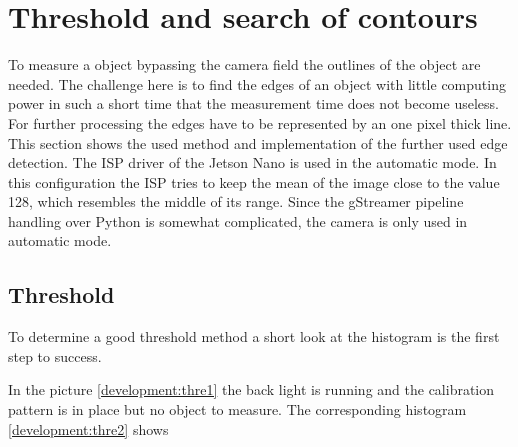 \section{Threshold and search of contours}
To measure a object bypassing the camera field the outlines of the object are needed. The challenge here is to find the edges of an object with little computing power in such a short time that the measurement time does not become useless. For further processing the edges have to be represented by an one pixel thick line. This section shows the used method and implementation of the further used edge detection. The ISP driver of the Jetson Nano is used in the automatic mode. In this configuration the ISP tries to keep the mean of the image close to the value 128, which resembles the middle of its range. Since the gStreamer pipeline handling over Python is somewhat complicated, the camera is only used in automatic mode.

\subsection{Threshold}
To determine a good threshold method a short look at the histogram is the first step to success.  
\begin{figure}[ht]
\end{figure}
In the picture \ref{development:thre1} the back light is running and the calibration pattern is in place but no object to measure. The corresponding histogram \ref{development:thre2} shows 